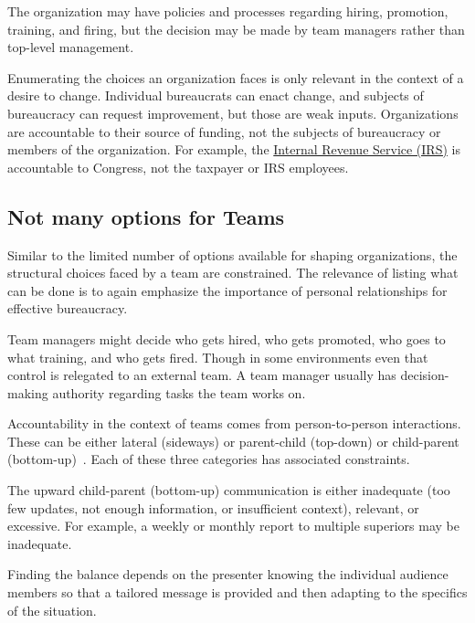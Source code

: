 The organization may have policies and processes regarding hiring, promotion, training, and firing, but the decision may be made by team managers rather than top-level management. 

Enumerating the choices an organization faces is only relevant in the context of a desire to change. 
Individual bureaucrats can enact change, and subjects of bureaucracy can request improvement, but those are weak inputs. 
Organizations are accountable to their source of funding, not the subjects of bureaucracy or members of the organization. For example, the \href{https://en.wikipedia.org/wiki/Internal_Revenue_Service}{Internal Revenue Service (IRS)} 
%
is accountable to Congress, not the taxpayer or IRS employees. 

\subsection*{Not many options for Teams}

Similar to the limited number of options available for shaping organizations, the structural choices faced by a team are constrained. The relevance of listing what can be done is to again emphasize the importance of personal relationships for effective bureaucracy. 

Team managers might decide who gets hired, who gets promoted, who goes to what training, and who gets fired. Though in some environments even that control is relegated to an external team. A team manager usually has decision-making authority regarding tasks the team works on. 

Accountability in the context of teams comes from person-to-person interactions. These can be either lateral (sideways) or parent-child (top-down) or child-parent (bottom-up)~\cite{2014_Jorgensen}. Each of these three categories has associated constraints.

The upward child-parent (bottom-up) communication is either inadequate (too few updates, not enough information, or insufficient context), relevant, or excessive. For example, a weekly or monthly report to multiple superiors may be inadequate. 

Finding the balance depends on the presenter knowing the individual audience members so that a tailored message is provided and then adapting to the specifics of the situation. 


